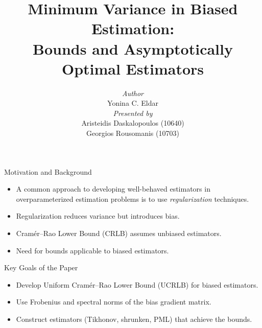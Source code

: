 \documentclass{beamer}
\title[Minimum Variance in Biased Estimation]{Minimum Variance in Biased Estimation: \\ Bounds and Asymptotically Optimal Estimators}
\author{\textit{Author} \\ Yonina C. Eldar \\ \vspace{+7pt}\textit{Presented by} \\ Aristeidis Daskalopoulos (10640) \\ Georgios Rousomanis (10703)}
\institute{IEEE Transactions on Signal Processing, July 2004}
\date{}
\begin{document}

\begin{frame}
  \titlepage
\end{frame}

\begin{frame}{Motivation and Background}
  \begin{itemize}
    \item A common approach to developing well-behaved estimators
    in overparameterized estimation problems is to use \textit{regularization} techniques.
    \item Regularization reduces variance but introduces bias.
    \item Cramér–Rao Lower Bound (CRLB) assumes unbiased estimators.
    \item Need for bounds applicable to biased estimators.
  \end{itemize}
\end{frame}

\begin{frame}{Key Goals of the Paper}
  \begin{itemize}
    \item Develop Uniform Cramér–Rao Lower Bound (UCRLB) for biased estimators.
    \item Use Frobenius and spectral norms of the bias gradient matrix.
    \item Construct estimators (Tikhonov, shrunken, PML) that achieve the bounds.
  \end{itemize}
\end{frame}
\end{document}
